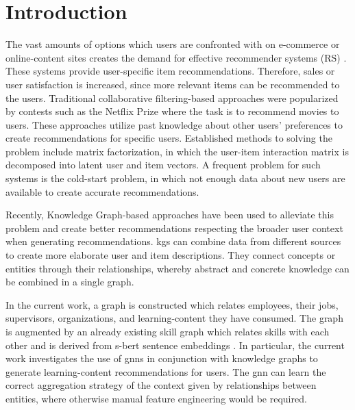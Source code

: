 \chapter{Introduction}



The vast amounts of options which users are confronted with on e-commerce or online-content sites creates the demand for effective recommender systems (RS) \parencite{lu2012recommender}. These systems provide user-specific item recommendations. 
Therefore, sales or user satisfaction is increased, since more relevant items can be recommended to the users. Traditional collaborative filtering-based approaches were popularized by contests such as the Netflix Prize \parencite{Bennett2007TheNP} where the task is to recommend movies to users. These approaches utilize past knowledge about other users' preferences to create recommendations for specific users. Established methods to solving the problem include matrix factorization, in which the user-item interaction matrix is decomposed into latent user and item vectors. A frequent problem for such systems is the cold-start problem, in which not enough data about new users are available to create accurate recommendations.

Recently, Knowledge Graph-based approaches \parencite{guo2020survey} have been used to alleviate this problem and create better recommendations respecting the broader user context when generating recommendations. \acp{kg} can combine data from different sources to create more elaborate user and item descriptions. They connect concepts or entities through their relationships, whereby abstract and concrete knowledge can be combined in a single graph. 

In the current work, a graph is constructed which relates employees, their jobs, supervisors, organizations, and learning-content they have consumed. The graph is augmented by an already existing skill graph which relates skills with each other and is derived from \ac{s-bert} sentence embeddings \parencite{Reimers2019SentenceBERTSE}.
In particular, the current work investigates the use of \acp{gnn} in conjunction with knowledge graphs to generate learning-content recommendations for users. The \ac{gnn} can learn the correct aggregation strategy of the context given by relationships between entities, where otherwise manual feature engineering would be required.

